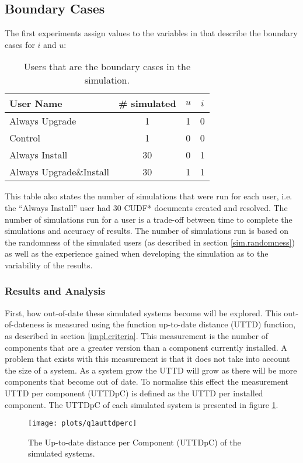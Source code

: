 \subsection{Boundary Cases}
The first experiments assign values to the variables in \usermodel that describe the boundary cases for $i$ and $u$:
\begin{table}[h!]
\centering
\begin{tabular}{|l | c | c | c |}
\hline
User Name 				 	& \# simulated 	& $u$ 		& $i$ 			\\ \hline
Always Upgrade				& 1 			& 1			& 0				 \\
Control						& 1 			& 0			& 0				\\
Always Install 				& 30 			& 0			& 1				 \\
Always Upgrade\&Install 	& 30 			& 1			& 1				\\ \hline
\end{tabular}
\caption{Users that are the boundary cases in the simulation.}
\label{exp.tblextremeusers}
\end{table}
This table also states the number of simulations that were run for each user, i.e. the ``Always Install'' user had 30 CUDF* documents created and resolved.
The number of simulations run for a user is a trade-off between time to complete the simulations and accuracy of results.
The number of simulations run is based on the randomness of the simulated users (as described in section \ref{sim.randomness}) 
as well as the experience gained when developing the simulation as to the variability of the results.

\subsubsection{Results and Analysis}
First, how out-of-date these simulated systems become will be explored.
This out-of-dateness is measured using the function up-to-date distance (UTTD) function, as described in section \ref{impl.criteria}.
This measurement is the number of components that are a greater version than a component currently installed.
A problem that exists with this measurement is that it does not take into account the size of a system.
As a system grow the UTTD will grow as there will be more components that become out of date.
To normalise this effect the measurement UTTD per component (UTTDpC) is defined as the UTTD per installed component.
The UTTDpC of each simulated system is presented in figure \ref{exp.q1auttdpc}.
\begin{figure}[htp]
\begin{center}
  \texttt{[image: plots/q1auttdperc]}
  \caption{The Up-to-date distance per Component (UTTDpC) of the simulated systems.}
  \label{exp.q1auttdpc}
\end{center}
\end{figure}

